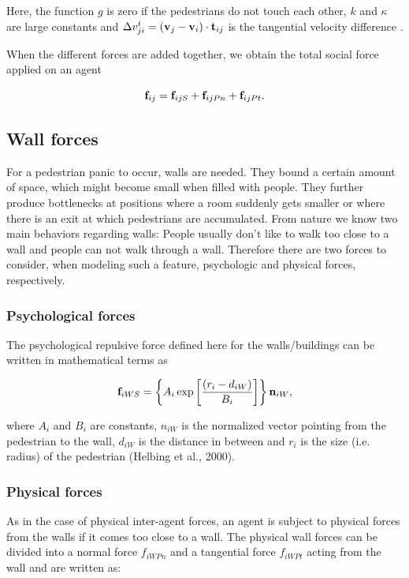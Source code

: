 \documentclass[11pt]{article}
\begin{document}
Here, the function $g$ is zero if the pedestrians do not touch each other, $k$ and $\kappa$ are large constants and $\Delta v_{ji}^t = ({\bf v}_j - {\bf v}_i)\cdot {\bf t}_{ij}$ is the tangential velocity difference \citep{Helbing2000}.

When the different forces are added together, we obtain the total social force applied on an agent

\begin{equation}
	{{\bf f}_{ij}} = {{\bf f}_{ijS}} + {{\bf f}_{ijPn}} + {{\bf f}_{ijPt}} .
		\label{eq:fij}
\end{equation}

\subsection{Wall forces}

For a pedestrian panic to occur, walls are needed. They bound a certain amount of space, which might become small when filled with people. They further produce bottlenecks at positions where a room suddenly gets smaller or where there is an exit at which pedestrians are accumulated. From nature we know two main behaviors regarding walls: People usually don't like to walk too close to a wall and people can not walk through a wall. Therefore there are two forces to consider, when modeling such a feature, psychologic and physical forces, respectively.

\subsubsection{Psychological forces}

The psychological repulsive force defined here for the walls/buildings can be written in mathematical terms as

\begin{equation}
	{{\bf f}_{iWS}} = \left\{ {{A_i}\exp \left[ {\frac{{\left( {{r_i} - {d_{iW}}} \right)}}{{{B_i}}}} \right]} \right\}{{\bf n}_{iW}} ,
	\label{eq:fiWS}
\end{equation}

where $A_i$ and $B_i$ are constants, $n_{iW}$ is the normalized vector pointing from the pedestrian to the wall, $d_{iW}$ is the distance in between and $r_i$ is the size (i.e. radius) of the pedestrian (Helbing et al., 2000).

\subsubsection{Physical forces}
As in the case of physical inter-agent forces, an agent is subject to physical forces from the walls if it comes too close to a wall. The physical wall forces can be divided into a normal force $f_{iWPn}$ and a tangential force $f_{iWPt}$ acting from the wall and are written as:
\end{document}
